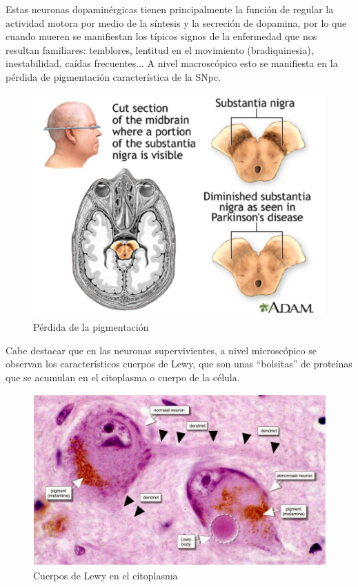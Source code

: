 Estas neuronas dopaminérgicas tienen principalmente la función de regular la actividad motora por medio de la síntesis y la secreción de dopamina, por lo que cuando mueren se manifiestan los típicos signos de la enfermedad que nos resultan familiares: temblores, lentitud en el movimiento (bradiquinesia), inestabilidad, caídas frecuentes... A nivel macroscópico esto se manifiesta en la pérdida de pigmentación característica de la SNpc.

\begin{figure}[H] %
	\centering
	\includegraphics[scale=0.4]{pigme.png}  %
	\caption{Pérdida de la pigmentación} 
	\label{fig:pigmentacion}
\end{figure}

Cabe destacar que en las neuronas supervivientes, a nivel microscópico se observan los característicos cuerpos de Lewy, que son unas ``bolsitas'' de proteínas que se acumulan en el citoplasma o cuerpo de la célula.

\begin{figure}[H] %
	\centering
	\includegraphics[scale=0.3]{cito.png}  %
	\caption{Cuerpos de Lewy en el citoplasma} 
	\label{fig:lewy}
\end{figure}

